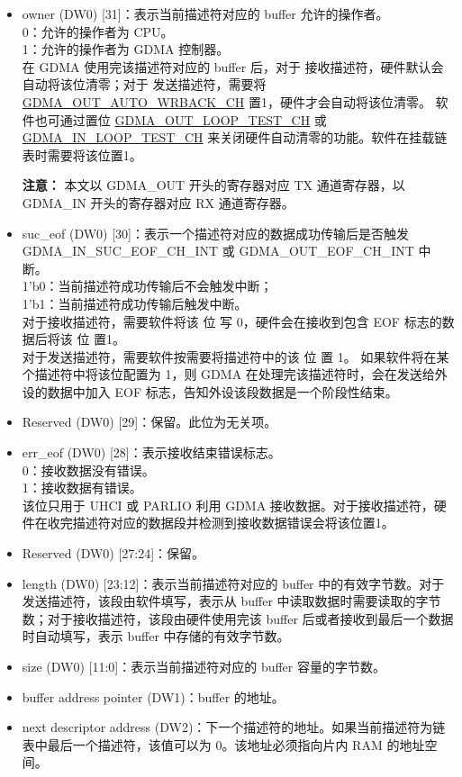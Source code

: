 \documentclass[main\_\_CN.tex]{subfiles}
\begin{document}
\begin{itemize}
    \item owner (DW0) [31]：表示当前描述符对应的 buffer 允许的操作者。\\
    0：允许的操作者为 CPU。\\
    1：允许的操作者为 GDMA 控制器。\\
    在 GDMA 使用完该描述符对应的 buffer 后，对于 接收描述符，硬件默认会自动将该位清零；对于 发送描述符，需要将 \hyperref[fielddesc:GDMAOUTAUTOWRBACKCHN]{GDMA\_OUT\_AUTO\_WRBACK\_CH} 置1，硬件才会自动将该位清零。 软件也可通过置位 \hyperref[fielddesc:GDMAOUTLOOPTESTCHN]{GDMA\_OUT\_LOOP\_TEST\_CH} 或 \hyperref[fielddesc:GDMAINLOOPTESTCHN]{GDMA\_IN\_LOOP\_TEST\_CH} 来关闭硬件自动清零的功能。软件在挂载链表时需要将该位置1。

    {\bfseries 注意： }本文以 GDMA\_OUT 开头的寄存器对应 TX 通道寄存器，以 GDMA\_IN 开头的寄存器对应 RX 通道寄存器。
    \item suc\_eof (DW0) [30]：表示一个描述符对应的数据成功传输后是否触发 GDMA\_IN\_SUC\_EOF\_CH\_INT 或 GDMA\_OUT\_EOF\_CH\_INT 中断。\\
    1'b0：当前描述符成功传输后不会触发中断；\\
    1'b1：当前描述符成功传输后触发中断。\\
    对于接收描述符，需要软件将该 位 写 0，硬件会在接收到包含 EOF 标志的数据后将该 位 置1。\\对于发送描述符，需要软件按需要将描述符中的该 位 置 1。
    如果软件将在某个描述符中将该位配置为 1，则 GDMA 在处理完该描述符时，会在发送给外设的数据中加入 EOF 标志，告知外设该段数据是一个阶段性结束。

    \item Reserved (DW0) [29]：保留。此位为无关项。
    \item err\_eof (DW0) [28]：表示接收结束错误标志。\\
    0：接收数据没有错误。\\
    1：接收数据有错误。\\
    该位只用于 UHCI 或 PARLIO 利用 GDMA 接收数据。对于接收描述符，硬件在收完描述符对应的数据段并检测到接收数据错误会将该位置1。
    \item Reserved (DW0) [27:24]：保留。
    \item length (DW0) [23:12]：表示当前描述符对应的 buffer 中的有效字节数。对于发送描述符，该段由软件填写，表示从 buffer 中读取数据时需要读取的字节数；对于接收描述符，该段由硬件使用完该 buffer 后或者接收到最后一个数据时自动填写，表示 buffer 中存储的有效字节数。
    \item size (DW0) [11:0]：表示当前描述符对应的 buffer 容量的字节数。
    \item buffer address pointer (DW1)：buffer 的地址。
    \item next descriptor address (DW2)：下一个描述符的地址。如果当前描述符为链表中最后一个描述符，该值可以为 0。该地址必须指向片内 RAM 的地址空间。
\end{itemize}
\end{document}
